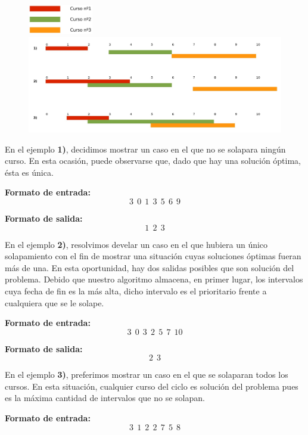 \begin{figure}[H] %
\includegraphics[width=80pt]{../imgs/leyendaejemploej2.jpg}
\begin{center}
\includegraphics[width=450pt]{../imgs/ejemplosej2.jpg}
\end{center}
\end{figure}
En el ejemplo \textbf{1)}, decidimos mostrar un caso en el que no se solapara ningún curso. En esta ocasión, puede observarse que, dado que hay una solución óptima, ésta es única.\newline

\textbf{Formato de entrada:}
$$3\ \ 0\ \ 1\ \ 3\ \ 5\ \ 6\ \ 9$$

\textbf{Formato de salida:}
$$1\ \ 2\ \ 3$$

En el ejemplo \textbf{2)}, resolvimos develar un caso en el que hubiera un único solapamiento con el fin de mostrar una situación cuyas soluciones óptimas fueran más de una. En esta oportunidad, hay dos salidas posibles que son solución del problema. Debido que nuestro algoritmo almacena, en primer lugar, los intervalos cuya fecha de fin es la más alta, dicho intervalo es el prioritario frente a cualquiera que se le solape.\newline

\textbf{Formato de entrada:}
$$3\ \ 0\ \ 3\ \ 2\ \ 5\ \ 7\ \ 10$$

\textbf{Formato de salida:}
$$2\ \ 3$$

En el ejemplo \textbf{3)}, preferimos mostrar un caso en el que se solaparan todos los cursos. En esta situación, cualquier curso del ciclo es solución del problema pues es la máxima cantidad de intervalos que no se solapan.\newline

\textbf{Formato de entrada:}
$$3\ \ 1\ \ 2\ \ 2\ \ 7\ \ 5\ \ 8$$

